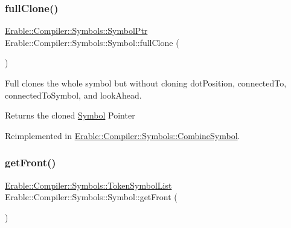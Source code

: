 \mbox{\label{class_erable_1_1_compiler_1_1_symbols_1_1_symbol_a1d3750618449b2185abf49b891b3a61c}} 
\subsubsection{\texorpdfstring{fullClone()}{fullClone()}}
{\footnotesize\ttfamily \mbox{\hyperlink{namespace_erable_1_1_compiler_1_1_symbols_a8f0bc762f448ea4d84e8713ab3e140b9}{Erable\+::\+Compiler\+::\+Symbols\+::\+Symbol\+Ptr}} Erable\+::\+Compiler\+::\+Symbols\+::\+Symbol\+::full\+Clone (\begin{DoxyParamCaption}{ }\end{DoxyParamCaption})\hspace{0.3cm}{\ttfamily [virtual]}}

Full clones the whole symbol but without cloning dot\+Position, connected\+To, connected\+To\+Symbol, and look\+Ahead. \begin{DoxyReturn}{Returns}
the cloned \mbox{\hyperlink{class_erable_1_1_compiler_1_1_symbols_1_1_symbol}{Symbol}} Pointer 
\end{DoxyReturn}


Reimplemented in \mbox{\hyperlink{struct_erable_1_1_compiler_1_1_symbols_1_1_combine_symbol_ac20bc8743057e8668bb3871b24dd180d}{Erable\+::\+Compiler\+::\+Symbols\+::\+Combine\+Symbol}}.

\mbox{\label{class_erable_1_1_compiler_1_1_symbols_1_1_symbol_a5602a81abe926c65b260f88812e7f3bc}} 
\subsubsection{\texorpdfstring{getFront()}{getFront()}\hspace{0.1cm}{\footnotesize\ttfamily [1/3]}}
{\footnotesize\ttfamily \mbox{\hyperlink{namespace_erable_1_1_compiler_1_1_symbols_aff1ccebebde106c3c5f3cdca118a1d69}{Erable\+::\+Compiler\+::\+Symbols\+::\+Token\+Symbol\+List}} Erable\+::\+Compiler\+::\+Symbols\+::\+Symbol\+::get\+Front (\begin{DoxyParamCaption}{ }\end{DoxyParamCaption})}

